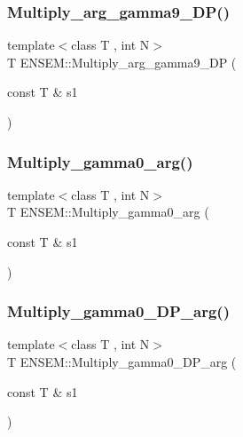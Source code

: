 \mbox{\label{namespaceENSEM_a223eca565597626d30b331276e97c32d}} 
\subsubsection{\texorpdfstring{Multiply\_arg\_gamma9\_DP()}{Multiply\_arg\_gamma9\_DP()}}
{\footnotesize\ttfamily template$<$class T , int N$>$ \\
T E\+N\+S\+E\+M\+::\+Multiply\+\_\+arg\+\_\+gamma9\+\_\+\+DP (\begin{DoxyParamCaption}\item[{const T \&}]{s1 }\end{DoxyParamCaption})\hspace{0.3cm}{\ttfamily [inline]}}

\mbox{\label{namespaceENSEM_a7da1d54d1c7f3aeeff82db6994436bb4}} 
\subsubsection{\texorpdfstring{Multiply\_gamma0\_arg()}{Multiply\_gamma0\_arg()}}
{\footnotesize\ttfamily template$<$class T , int N$>$ \\
T E\+N\+S\+E\+M\+::\+Multiply\+\_\+gamma0\+\_\+arg (\begin{DoxyParamCaption}\item[{const T \&}]{s1 }\end{DoxyParamCaption})\hspace{0.3cm}{\ttfamily [inline]}}

\mbox{\label{namespaceENSEM_a70979a2e217f7ceece8d9505057fc050}} 
\subsubsection{\texorpdfstring{Multiply\_gamma0\_DP\_arg()}{Multiply\_gamma0\_DP\_arg()}}
{\footnotesize\ttfamily template$<$class T , int N$>$ \\
T E\+N\+S\+E\+M\+::\+Multiply\+\_\+gamma0\+\_\+\+D\+P\+\_\+arg (\begin{DoxyParamCaption}\item[{const T \&}]{s1 }\end{DoxyParamCaption})\hspace{0.3cm}{\ttfamily [inline]}}

